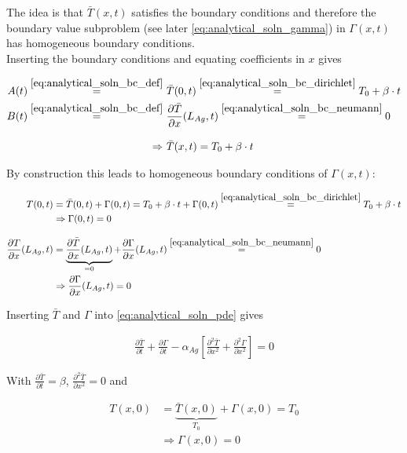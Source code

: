 \documentclass{scrartcl}[12pt, halfparskip]
\numberwithin{equation}{section}
\numberwithin{figure}{section}
\numberwithin{table}{section}
\begin{document}
The idea is that $\bar{T}(x,t)$ satisfies the boundary conditions and therefore the boundary value subproblem (see later \cref{eq:analytical_soln_gamma}) in $\Gamma(x,t)$ has homogeneous boundary conditions. \\
Inserting the boundary conditions and equating coefficients in $x$ gives

\begin{align}
	A(t) \stackrel{\eqref{eq:analytical_soln_bc_def}}{=} & \ \bar{T}(0,t)  \stackrel{\eqref{eq:analytical_soln_bc_dirichlet}}{=} T_0 + \beta \cdot t \\
	B(t) \stackrel{\eqref{eq:analytical_soln_bc_def}}{=} & \ \frac{\partial \bar{T}}{\partial x}(L_{Ag},t) \stackrel{\eqref{eq:analytical_soln_bc_neumann}}{=} 0 \\[2ex]
	\Rightarrow & \ \bar{T}(x,t) = T_0 + \beta \cdot t
\end{align}



By construction this leads to homogeneous boundary conditions of $\Gamma(x,t)$:

\begin{align}
	T(0,t) & = \bar{T}(0,t) + \Gamma(0,t) = T_0 + \beta \cdot t + \Gamma(0,t) \stackrel{\cref{eq:analytical_soln_bc_dirichlet}}{=} T_0 + \beta \cdot t \\
	 &\Rightarrow \Gamma(0,t) = 0 \\[2ex]
	\frac{\partial T}{\partial x}(L_{Ag},t) & = \underbrace{\frac{\partial \bar{T}}{\partial x}(L_{Ag},t)}_{= 0} + \frac{\partial \Gamma}{\partial x}(L_{Ag},t) \stackrel{\cref{eq:analytical_soln_bc_neumann}}{=} 0 \\
	 &\Rightarrow \frac{\partial \Gamma}{\partial x}(L_{Ag},t) = 0
\end{align}


Inserting $\bar{T}$ and $\Gamma$ into \cref{eq:analytical_soln_pde} gives

\begin{align}
	\frac{\partial \bar{T}}{\partial t} + \frac{\partial \Gamma}{\partial t} - \alpha_{Ag} \left[ \frac{\partial^2 \bar{T}}{\partial x^2} + \frac{\partial^2 \Gamma}{\partial x^2} \right] = 0
\end{align}
	

	
	
With $\frac{\partial \bar{T}}{\partial t} = \beta$, $\frac{\partial^2 \bar{T}}{\partial x^2} = 0$ and

\begin{align}
T(x,0) & = \underbrace{\bar{T}(x,0)}_{T_0} + \Gamma(x,0) = T_0 \\
& \Rightarrow \Gamma(x,0) = 0
\end{align}
\end{document}
